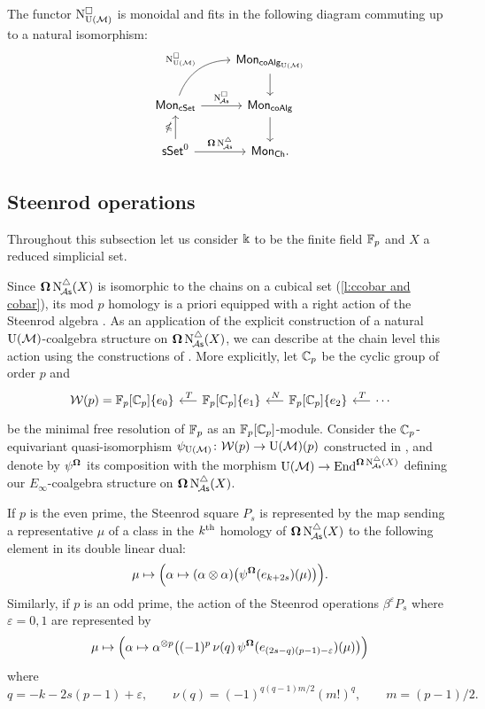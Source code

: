\begin{lemma} \label{l:lift of cobar to e-infty}
	The functor $\operatorname{N^{\square}_{{\operatorname{U}(\mathcal{M})}}}$ is monoidal and fits in the following diagram commuting up to a natural isomorphism:
	\[
	\begin{tikzcd}
	& \Mon_{\coAlg_\UM} \arrow[d] \\
	\Mon_{\cSet} \arrow[ru, "\cchainsUM", out=70, in=180] \arrow[r, "\cchainsA"]
	& \Mon_{\coAlg} \arrow[d] \\
	\sSet^0 \arrow[r, "\cobar \schainsA"] \arrow[u, "\ccobar"]
	& \Mon_{\Ch}.
	\end{tikzcd}
	\]
\end{lemma}

\subsection{Steenrod operations}

Throughout this subsection let us consider $\Bbbk$ to be the finite field ${\mathbb{F}_p}$ and $X$ a reduced simplicial set.

Since $\operatorname{\mathbf{\Omega}} \operatorname{N^{\triangle}_{\!{\mathcal{A}\mathsf{s}}}}(X)$ is isomorphic to the chains on a cubical set (\cref{l:ccobar and cobar}), its mod $p$ homology is a priori equipped with a right action of the Steenrod algebra \cite{steenrod1962cohomology, milnor1958steenrod}.
As an application of the explicit construction of a natural ${\operatorname{U}(\mathcal{M})}$-coalgebra structure on $\operatorname{\mathbf{\Omega}} \operatorname{N^{\triangle}_{\!{\mathcal{A}\mathsf{s}}}}(X)$, we can describe at the chain level this action using the constructions of \cite{medina2020maysteenrod}.
More explicitly, let ${\mathbb{C}_p}$ be the cyclic group of order $p$ and
\[
\begin{tikzcd} [column sep = .5cm]
\cW(p) = \Fp[\Cp]\{e_0\} & \arrow[l, "\,T"'] \Fp[\Cp]\{e_1\} & \arrow[l, "\,N"'] \Fp[\Cp]\{e_2\} & \arrow[l, "\,T"'] \dotsb
\end{tikzcd}
\]
be the minimal free resolution of ${\mathbb{F}_p}$ as an ${\mathbb{F}_p}[{\mathbb{C}_p}]$-module.
Consider the ${\mathbb{C}_p}$-equivariant quasi-isomorphism $\psi_{\operatorname{U}(\mathcal{M})} \colon \mathcal{W}(p) \to {\operatorname{U}(\mathcal{M})}(p)$ constructed in \cite{medina2020maysteenrod}, and denote by $\psi^{\operatorname{\mathbf{\Omega}}}$ its composition with the morphism ${\operatorname{U}(\mathcal{M})} \to \mathrm{End}^{\operatorname{\mathbf{\Omega}} \operatorname{N^{\triangle}_{\!{\mathcal{A}\mathsf{s}}}}(X)}$ defining our $E_\infty$-coalgebra structure on $\operatorname{\mathbf{\Omega}} \operatorname{N^{\triangle}_{\!{\mathcal{A}\mathsf{s}}}}(X)$.

If $p$ is the even prime, the Steenrod square $P_s$ is represented by the map sending a representative $\mu$ of a class in the $k^{\mathrm{th}}$ homology of $\operatorname{\mathbf{\Omega}} \operatorname{N^{\triangle}_{\!{\mathcal{A}\mathsf{s}}}}(X)$ to the following element in its double linear dual:
\[
\mu \mapsto
\Big( \alpha \mapsto (\alpha \otimes \alpha) \big( \psi^{\operatorname{\mathbf{\Omega}}}(e_{k+2s})(\mu) \big) \Big).
\]
Similarly, if $p$ is an odd prime, the action of the Steenrod operations $\beta^\varepsilon P_{s}$ where $\varepsilon = 0,1$ are represented by
\[
\mu \mapsto
\Big( \alpha \mapsto \alpha^{\otimes p} \big( (-1)^p \, \nu(q) \, \psi^{\operatorname{\mathbf{\Omega}}}(e_{(2s-q)(p-1)-\varepsilon})(\mu) \big) \Big)
\]
where
\[
q = -k -2s(p-1)+\varepsilon, \qquad
\nu(q) = (-1)^{q(q-1)m/2}(m!)^q, \qquad
m = (p-1)/2.
\]

